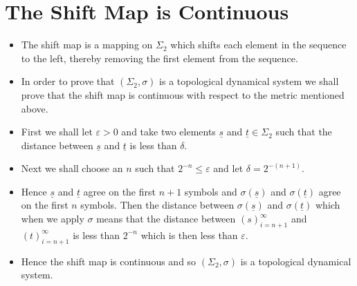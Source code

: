 \documentclass{article}
\begin{document}
    \section{The Shift Map is Continuous}
    \begin{itemize}
        \item The shift map is a mapping on $\Sigma_2$ which shifts each element in the sequence to the left, thereby removing the first element from the sequence.
        \item In order to prove that $(\Sigma_2, \sigma)$ is a topological dynamical system we shall prove that the shift map is continuous with respect to the metric mentioned above.
        \item First we shall let $\varepsilon > 0$ and take two elements $\underline{s}$ and $\underline{t} \in \Sigma_2$ such that the distance between $\underline{s}$ and $\underline{t}$ is less than $\delta$. 
        \item Next we shall choose an $n$ such that $2^{-n} \leq \varepsilon$ and let $\delta = 2^{-(n+1)}$. 
        \item Hence $\underline{s}$ and $\underline{t}$ agree on the first $n + 1$ symbols and $\sigma(\underline{s})$ and $\sigma(\underline{t})$ agree on the first $n$ symbols. Then the distance between $\sigma(\underline{s})$ and $\sigma(\underline{t})$ which when we apply $\sigma$ means that the distance between $(s)_{i=n+1}^{\infty}$ and $(t)_{i=n+1}^{\infty}$ is less than $2^{-n}$ which is then less than $\varepsilon$.
        \item Hence the shift map is continuous and so $(\Sigma_2, \sigma)$ is a topological dynamical system.
    \end{itemize}
\end{document}
